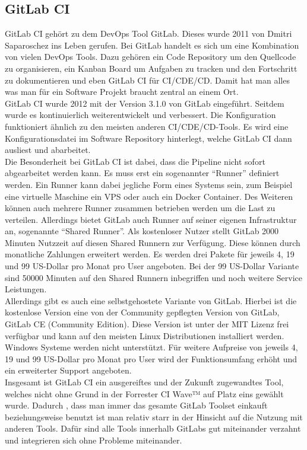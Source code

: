 \subsection{GitLab CI}
GitLab CI gehört zu dem DevOps Tool GitLab. Dieses wurde 2011 von Dmitri Saparoschez ins Leben gerufen. Bei GitLab handelt es sich um eine Kombination von vielen DevOps Tools. Dazu gehören ein Code Repository um den Quellcode zu organisieren, ein Kanban Board um Aufgaben zu tracken und den Fortschritt zu dokumentieren und eben GitLab CI für \ac{CI}/\ac{CDE}/\ac{CD}. Damit hat man alles was man für ein Software Projekt braucht zentral an einem Ort.\\ 
GitLab CI wurde 2012 mit der Version 3.1.0 von GitLab eingeführt. Seitdem wurde es kontinuierlich weiterentwickelt und verbessert. Die Konfiguration funktioniert ähnlich zu den meisten anderen \ac{CI}/\ac{CDE}/\ac{CD}-Tools. Es wird eine Konfigurationsdatei im Software Repository hinterlegt, welche GitLab CI dann ausliest und abarbeitet.\\
 Die Besonderheit bei GitLab CI ist dabei, dass die Pipeline nicht sofort abgearbeitet werden kann. Es muss erst ein sogenannter \enquote{Runner} definiert werden. Ein Runner kann dabei jegliche Form eines Systems sein, zum Beispiel eine virtuelle Maschine ein VPS oder auch ein Docker Container. Des Weiteren können auch mehrere Runner zusammen betrieben werden um die Last zu verteilen. Allerdings bietet GitLab auch Runner auf seiner eigenen Infrastruktur an, sogenannte \enquote{Shared Runner}. Als kostenloser Nutzer stellt GitLab 2000 Minuten Nutzzeit auf diesen Shared Runnern zur Verfügung. Diese können durch monatliche Zahlungen erweitert werden. Es werden drei Pakete für jeweils 4, 19 und 99 US-Dollar pro Monat pro User angeboten. Bei der 99 US-Dollar Variante sind 50000 Minuten auf den Shared Runnern inbegriffen und noch weitere Service Leistungen.\\
Allerdings gibt es auch eine selbstgehostete Variante von GitLab. Hierbei ist die kostenlose Version eine von der Community gepflegten Version von GitLab, GitLab CE (Community Edition). Diese Version ist unter der MIT Lizenz frei verfügbar und kann auf den meisten Linux Distributionen installiert werden. Windows Systeme werden nicht unterstützt. Für weitere Aufpreise von jeweils 4, 19 und 99 US-Dollar pro Monat pro User wird der Funktionsumfang erhöht und ein erweiterter Support angeboten.\\
Insgesamt ist GitLab CI ein ausgereiftes und der Zukunft zugewandtes Tool, welches nicht ohne Grund in der Forrester CI Wave™ auf Platz eins gewählt wurde\autocite{Forrester.2017}. Dadurch , dass man immer das gesamte GitLab Toolset einkauft beziehungsweise benutzt ist man relativ starr in der Hinsicht auf die Nutzung mit anderen Tools. Dafür sind alle Tools innerhalb GitLabs gut miteinander verzahnt und integrieren sich ohne Probleme miteinander.\\ 
